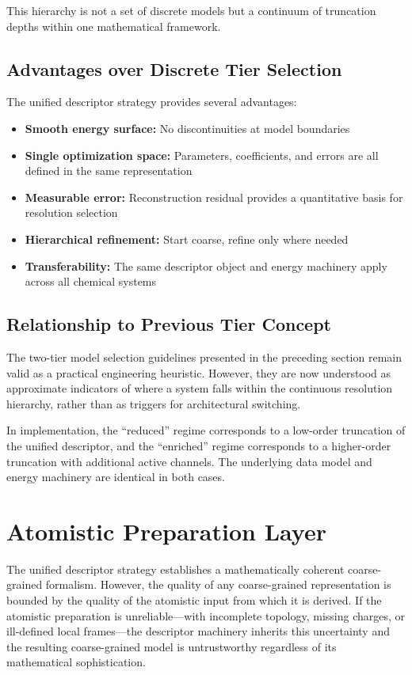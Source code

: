 \documentclass[11pt]{article}
\begin{document}
This hierarchy is not a set of discrete models but a continuum of truncation depths within one mathematical framework.

\subsection{Advantages over Discrete Tier Selection}

The unified descriptor strategy provides several advantages:

\begin{itemize}
    \item \textbf{Smooth energy surface:} No discontinuities at model boundaries
    \item \textbf{Single optimization space:} Parameters, coefficients, and errors are all defined in the same representation
    \item \textbf{Measurable error:} Reconstruction residual provides a quantitative basis for resolution selection
    \item \textbf{Hierarchical refinement:} Start coarse, refine only where needed
    \item \textbf{Transferability:} The same descriptor object and energy machinery apply across all chemical systems
\end{itemize}

\subsection{Relationship to Previous Tier Concept}

The two-tier model selection guidelines presented in the preceding section remain valid as a practical engineering heuristic. However, they are now understood as approximate indicators of where a system falls within the continuous resolution hierarchy, rather than as triggers for architectural switching.

In implementation, the ``reduced'' regime corresponds to a low-order truncation of the unified descriptor, and the ``enriched'' regime corresponds to a higher-order truncation with additional active channels. The underlying data model and energy machinery are identical in both cases.

\section{Atomistic Preparation Layer}

The unified descriptor strategy establishes a mathematically coherent coarse-grained formalism. However, the quality of any coarse-grained representation is bounded by the quality of the atomistic input from which it is derived. If the atomistic preparation is unreliable---with incomplete topology, missing charges, or ill-defined local frames---the descriptor machinery inherits this uncertainty and the resulting coarse-grained model is untrustworthy regardless of its mathematical sophistication.
\end{document}
